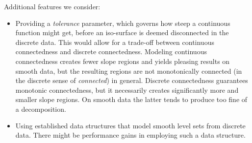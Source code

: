 \documentclass[11pt,twoside,twocolumn,a4paper]{article}
\theoremstyle{plain}
\theoremstyle{definition}
\begin{document}
Additional features we consider:
\begin{itemize}
\item Providing a \emph{tolerance} parameter, which governs how steep a continuous function might get, before an iso-surface is deemed disconnected in the discrete data.
This would allow for a trade-off between continuous connectedness and discrete connectedness.
Modeling continuous connectedness creates fewer slope regions and yields pleasing results on smooth data, but the resulting regions are not monotonically connected (in the discrete sense of \emph{connected}) in general.
Discrete connectedness guarantees monotonic connectedness, but it necessarily creates significantly more and smaller slope regions.
On smooth data the latter tends to produce too fine of a decomposition.
\item Using established data structures that model smooth level sets from discrete data. There might be performance gains in employing such a data structure.
\end{itemize}

\end{document}
